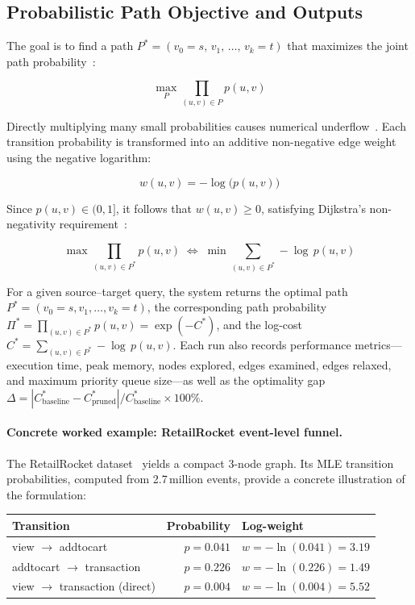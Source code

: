 \subsection{Probabilistic Path Objective and Outputs}

The goal is to find a path $P^* = (v_0 = s,\, v_1,\, \ldots,\, v_k = t)$ that maximizes the joint path probability~\citep{norris1998markov}:

\[
\max_{P} \prod_{(u,v) \in P} p(u,v)
\]

Directly multiplying many small probabilities causes numerical underflow~\citep{manning1999nlp}. Each transition probability is transformed into an additive non-negative edge weight using the negative logarithm:

\[
w(u,v) = -\log\bigl(p(u,v)\bigr)
\]

Since $p(u,v) \in (0,1]$, it follows that $w(u,v) \geq 0$, satisfying Dijkstra's non-negativity requirement~\citep{cormen2009}:

\[
\max \prod_{(u,v)\in P^*} p(u,v) \;\iff\; \min \sum_{(u,v)\in P^*} -\log\, p(u,v)
\]

For a given source--target query, the system returns the optimal path $P^* = (v_0 = s, v_1, \ldots, v_k = t)$, the corresponding path probability $\Pi^* = \prod_{(u,v)\in P^*} p(u,v) = \exp(-C^*)$, and the log-cost $C^* = \sum_{(u,v)\in P^*} -\log\, p(u,v)$. Each run also records performance metrics---execution time, peak memory, nodes explored, edges examined, edges relaxed, and maximum priority queue size---as well as the optimality gap $\Delta = |C^*_{\text{baseline}} - C^*_{\text{pruned}}| / C^*_{\text{baseline}} \times 100\%$.

\paragraph{Concrete worked example: RetailRocket event-level funnel.}
The RetailRocket dataset~\citep{retailrocket2015} yields a compact 3-node graph.
Its MLE transition probabilities, computed from 2.7\,million events, provide a concrete illustration of the formulation:

\begin{center}
\small
\begin{tabular}{@{}lrl@{}}
\toprule
\textbf{Transition} & \textbf{Probability} & \textbf{Log-weight} \\
\midrule
view $\to$ addtocart    & $p = 0.041$ & $w = -\ln(0.041) = 3.19$ \\
addtocart $\to$ transaction & $p = 0.226$ & $w = -\ln(0.226) = 1.49$ \\
view $\to$ transaction (direct) & $p = 0.004$ & $w = -\ln(0.004) = 5.52$ \\
\bottomrule
\end{tabular}
\end{center}

